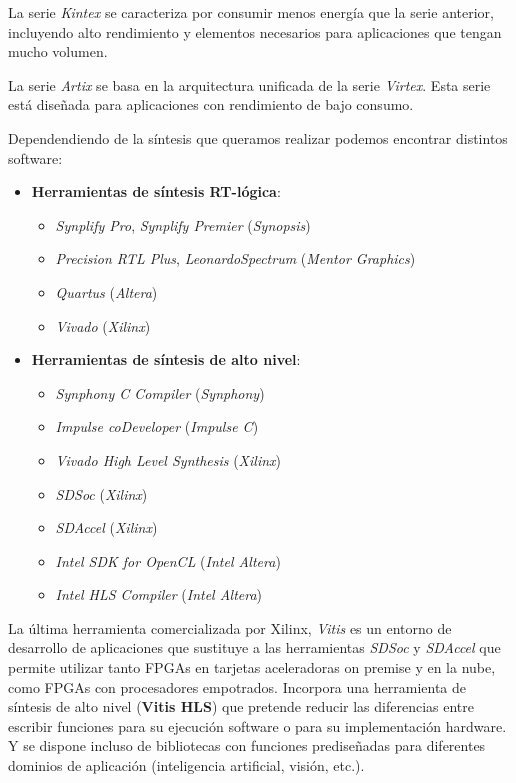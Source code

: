La serie \textit{Kintex} se caracteriza por consumir menos energía que la serie anterior, incluyendo alto rendimiento y elementos necesarios 
para aplicaciones que tengan mucho volumen.

La serie \textit{Artix} se basa en la arquitectura unificada de la serie \textit{Virtex}. Esta serie está diseñada para aplicaciones con 
rendimiento de bajo consumo. 

Dependendiendo de la síntesis que queramos realizar podemos encontrar distintos software:

\begin{itemize}
    \item \textbf{Herramientas de síntesis RT-lógica}:
        \begin{itemize}
            \item \textit{Synplify Pro}, \textit{Synplify Premier} (\textit{Synopsis})
            \item \textit{Precision RTL Plus}, \textit{LeonardoSpectrum} (\textit{Mentor Graphics})
            \item \textit{Quartus} (\textit{Altera})
            \item \textit{Vivado} (\textit{Xilinx})
        \end{itemize}
    \item \textbf{Herramientas de síntesis de alto nivel}:
        \begin{itemize}
            \item \textit{Synphony C Compiler} (\textit{Synphony})
            \item \textit{Impulse coDeveloper} (\textit{Impulse C})
            \item \textit{Vivado High Level Synthesis} (\textit{Xilinx})
            \item \textit{SDSoc} (\textit{Xilinx})
            \item \textit{SDAccel} (\textit{Xilinx})
            \item \textit{Intel SDK for OpenCL} (\textit{Intel Altera})
            \item \textit{Intel HLS Compiler} (\textit{Intel Altera})
        \end{itemize}
\end{itemize}

La última herramienta comercializada por Xilinx, \textit{Vitis} es un entorno de desarrollo de aplicaciones que sustituye a las herramientas 
\textit{SDSoc} y \textit{SDAccel} que permite utilizar tanto FPGAs en tarjetas aceleradoras on premise y en la nube, como FPGAs con procesadores 
empotrados. Incorpora una herramienta de síntesis de alto nivel (\textbf{Vitis HLS}) que pretende reducir las diferencias entre escribir 
funciones para su ejecución software o para su implementación hardware. Y se dispone incluso de bibliotecas con funciones prediseñadas 
para diferentes dominios de aplicación (inteligencia artificial, visión, etc.).

